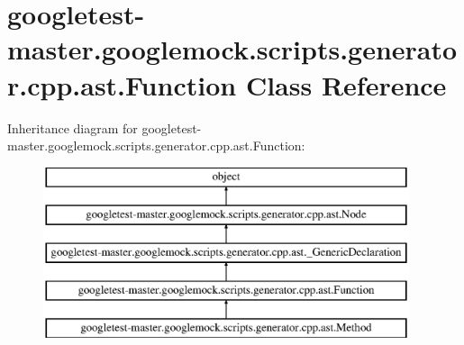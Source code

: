 \hypertarget{classgoogletest-master_1_1googlemock_1_1scripts_1_1generator_1_1cpp_1_1ast_1_1_function}{}\section{googletest-\/master.googlemock.\+scripts.\+generator.\+cpp.\+ast.\+Function Class Reference}
\label{classgoogletest-master_1_1googlemock_1_1scripts_1_1generator_1_1cpp_1_1ast_1_1_function}
Inheritance diagram for googletest-\/master.googlemock.\+scripts.\+generator.\+cpp.\+ast.\+Function\+:\begin{figure}[H]
\begin{center}
\leavevmode
\includegraphics[height=5.000000cm]{d0/d0f/classgoogletest-master_1_1googlemock_1_1scripts_1_1generator_1_1cpp_1_1ast_1_1_function}
\end{center}
\end{figure}
